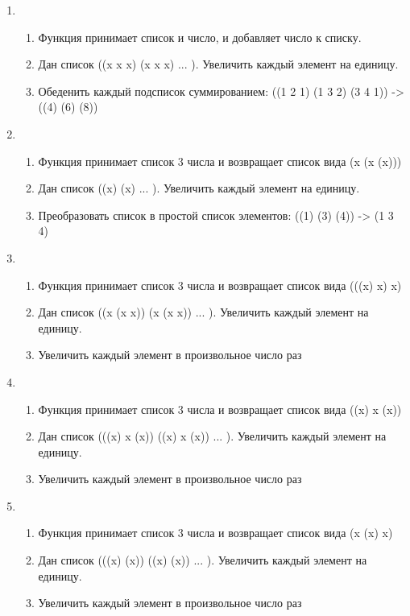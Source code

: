 \documentclass[a4paper,12pt]{article}
\begin{document}
\begin{enumerate}
	\item \begin{enumerate}
		\item Функция принимает список и число, и добавляет число к списку.
		\item Дан список ((x x x) (x x x) ... ). Увеличить каждый элемент на единицу.
		\item Обеденить каждый подсписок суммированием: ((1 2 1) (1 3 2) (3 4 1)) -> ((4) (6) (8))
	\end{enumerate}

	\item \begin{enumerate}
		\item Функция принимает список 3 числа и возвращает список вида (x (x (x)))
		\item Дан список ((x) (x) ... ). Увеличить каждый элемент на единицу.
		\item Преобразовать список в простой список элементов: ((1) (3) (4)) -> (1 3 4)
	\end{enumerate}

	\item \begin{enumerate}
		\item Функция принимает список 3 числа и возвращает список вида (((x) x) x)
		\item Дан список ((x (x x)) (x (x x)) ... ). Увеличить каждый элемент на единицу.
		\item Увеличить каждый элемент в произвольное число раз
	\end{enumerate}

	\item \begin{enumerate}
		\item Функция принимает список 3 числа и возвращает список вида ((x) x (x))
		\item Дан список (((x) x (x)) ((x) x (x)) ... ). Увеличить каждый элемент на единицу.
		\item Увеличить каждый элемент в произвольное число раз
	\end{enumerate}

	\item \begin{enumerate}
		\item Функция принимает список 3 числа и возвращает список вида (x (x) x)
		\item Дан список (((x) (x)) ((x) (x)) ... ). Увеличить каждый элемент на единицу.
		\item Увеличить каждый элемент в произвольное число раз
	\end{enumerate}


\end{enumerate}
\end{document}
